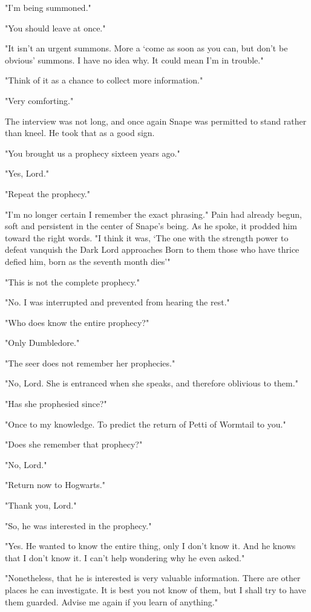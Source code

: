 "I'm being summoned."

"You should leave at once."

"It isn't an urgent summons. More a `come as soon as you can, but don't be obvious' summons. I have no idea why. It could mean I'm in trouble."

"Think of it as a chance to collect more information."

"Very comforting."

The interview was not long, and once again Snape was permitted to stand rather than kneel. He took that as a good sign.

"You brought us a prophecy sixteen years ago."

"Yes, Lord."

"Repeat the prophecy."

"I'm no longer certain I remember the exact phrasing." Pain had already begun, soft and persistent in the center of Snape's being. As he spoke, it prodded him toward the right words. "I think it was, `The one with the strength{\el} power to defeat{\el} vanquish the Dark Lord approaches{\el} Born to them{\el} those who have thrice{\el} defied him, born as the seventh month{\el} dies{\el}'"

"This is not the complete prophecy."

"No. I was interrupted and prevented from hearing the rest."

"Who does know the entire prophecy?"

"Only Dumbledore."

"The seer does not remember her prophecies."

"No, Lord. She is entranced when she speaks, and therefore oblivious to them."

"Has she prophesied since?"

"Once to my knowledge. To predict the return of Petti{\el} of Wormtail to you."

"Does she remember that prophecy?"

"No, Lord."

"Return now to Hogwarts."

"Thank you, Lord."

\sbreak

"So, he was interested in the prophecy."

"Yes. He wanted to know the entire thing, only I don't know it. And he knows that I don't know it. I can't help wondering why he even asked."

"Nonetheless, that he is interested is very valuable information. There are other places he can investigate. It is best you not know of them, but I shall try to have them guarded. Advise me again if you learn of anything."

